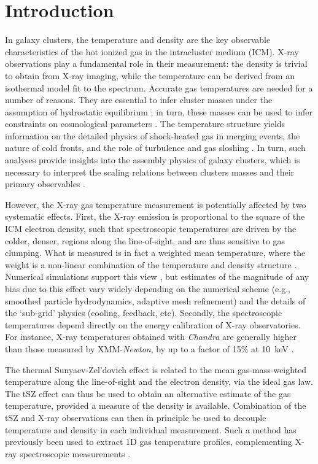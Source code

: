 \documentclass[twocolumn,traditabstract]{aa}
\newcommand{\ccor}[1]{\textcolor{Mypink}{#1}}
\begin{document}
\section{Introduction}\label{sec:Introduction}
In galaxy clusters, the temperature and density are the key observable characteristics of the hot ionized gas in the intracluster medium (ICM). X-ray observations play a fundamental role in their measurement: the density is trivial to obtain from X-ray imaging, while the temperature can be derived from an isothermal model fit to the spectrum. Accurate gas temperatures are needed for a number of reasons. They are essential to infer cluster masses under the assumption of hydrostatic equilibrium \citep{Sarazin1988}; in turn, these masses can be used to infer constraints on cosmological parameters \citep[e.g.,][]{Allen2011}. The temperature structure yields information on the detailed physics of shock-heated gas in merging events, the nature of cold fronts, and the role of turbulence and gas sloshing \citep[see, e.g.,][for a review]{mar07}. In turn, such analyses provide insights into the assembly physics of galaxy clusters, which is necessary to interpret the scaling relations between clusters masses and their primary observables \citep{Khedekar2013}.

However, the X-ray gas temperature measurement is potentially affected by two systematic effects. First, the X-ray emission is proportional to the square of the ICM electron density, such that spectroscopic temperatures are driven by the colder, denser, regions along the line-of-sight, and are thus sensitive to gas clumping. What is measured is in fact a weighted mean temperature, where the weight is a non-linear combination of the temperature and density structure \citep[see, e.g.,][]{maz04,vik06b}. Numerical simulations support this view \citep[e.g.,][]{Nagai2007,ras14}, but estimates of the magnitude of any bias due to this effect vary widely depending on the numerical scheme (e.g., smoothed particle hydrodynamics, adaptive mesh refinement) and the details of the `sub-grid' physics (cooling, feedback, etc). Secondly, the spectroscopic temperatures depend directly on the energy calibration of X-ray observatories. For instance, X-ray temperatures obtained with \textit{Chandra} are generally higher than those measured by XMM-\textit{Newton}, by up to a factor of 15\% at 10~keV \citep[e.g.,][]{Mahdavi2013}.

The thermal Sunyaev-Zel'dovich \citep[tSZ,][]{Sunyaev1972} effect is related to the mean gas-mass-weighted temperature along the line-of-sight and the electron density, via the ideal gas law. The tSZ effect can thus be used to obtain an alternative estimate of the gas temperature, provided a measure of the density is available. Combination of the tSZ and X-ray observations can then in principle be used to decouple temperature and density in each individual measurement. \ccor{Such a method has previously been used to extract 1D gas temperature profiles, complementing X-ray spectroscopic measurements \citep[e.g.,][]{Pointecouteau2002,Kitayama2004,Nord2009,Basu2010,Eckert2013,Ruppin2016}.}
\end{document}
